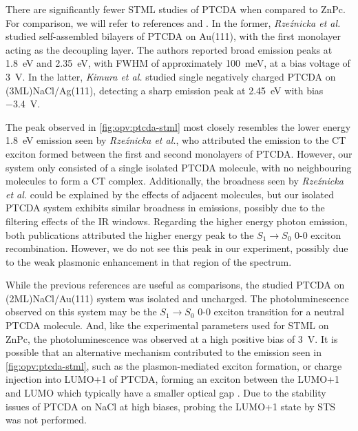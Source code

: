 There are significantly fewer \ac{STML} studies of PTCDA when compared to ZnPc. For comparison, we will refer to references \citep{Rzeznicka2011} and \citep{Kimura2019}. In the former, \textit{Rze\'znicka et al.} studied self-assembled bilayers of PTCDA on Au(111), with the first monolayer acting as the decoupling layer. The authors reported broad emission peaks at \SI{1.8}{eV} and \SI{2.35}{eV}, with FWHM of approximately \SI{100}{meV}, at a bias voltage of \SI{3}{V}. In the latter, \textit{Kimura et al.} studied single negatively charged PTCDA on (3ML)NaCl/Ag(111), detecting a sharp emission peak at \SI{2.45}{eV} with bias \SI{-3.4}{V}. 

The peak observed in \autoref{fig:opv:ptcda-stml} most closely resembles the lower energy \SI{1.8}{eV} emission seen by \textit{Rze\'znicka et al.}, who attributed the emission to the \ac{CT} exciton formed between the first and second monolayers of PTCDA. However, our system only consisted of a single isolated PTCDA molecule, with no neighbouring molecules to form a \ac{CT} complex. Additionally, the broadness seen by \textit{Rze\'znicka et al.} could be explained by the effects of adjacent molecules, but our isolated PTCDA system exhibits similar broadness in emissions, possibly due to the filtering effects of the IR windows. Regarding the higher energy photon emission, both publications attributed the higher energy peak to the $S_1 \rightarrow S_0$ 0-0 exciton recombination. However, we do not see this peak in our experiment, possibly due to the weak plasmonic enhancement in that region of the spectrum.

While the previous references are useful as comparisons, the studied PTCDA on (2ML)NaCl/Au(111) system was isolated and uncharged. The photoluminescence observed on this system may be the $S_1 \rightarrow S_0$ 0-0 exciton transition for a neutral PTCDA molecule. And, like the experimental parameters used for \ac{STML} on ZnPc, the photoluminescence was observed at a high positive bias of \SI{3}{V}. It is possible that an alternative mechanism contributed to the emission seen in \autoref{fig:opv:ptcda-stml}, such as the plasmon-mediated exciton formation, or charge injection into LUMO+1 of PTCDA, forming an exciton between the LUMO+1 and LUMO which typically have a smaller optical gap \citep{Wu2008}. Due to the stability issues of PTCDA on NaCl at high biases, probing the LUMO+1 state by \ac{STS} was not performed.







